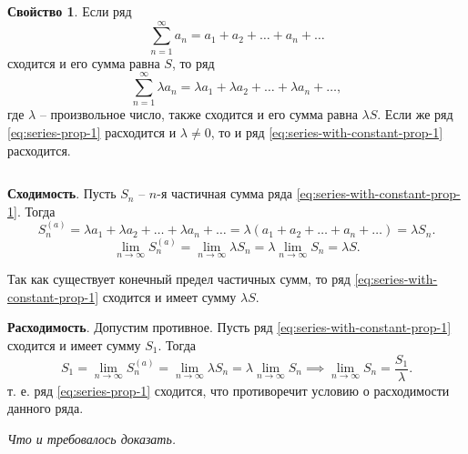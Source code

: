 \documentclass[a5paper, 11pt]{extbook}
\theoremstyle{definition}
\newtheorem{property}{Свойство}[section]
\theoremstyle{definition}
\theoremstyle{definition}
\newcommand{\newpar}{$ $\par\nobreak\ignorespaces}
\renewenvironment{proof}{{\noindent\bfseries Доказательство.}}{\smallskip\newpar \hfill\textit{Что и требовалось доказать.}}
\begin{document}
\begin{property}
    Если ряд
    \begin{equation}
        \label{eq:series-prop-1}
        \sum_{n = 1}^{\infty} a_n = a_1 + a_2 + \ldots + a_n + \ldots
    \end{equation}
    сходится и его сумма равна \(S\), то ряд
    \begin{equation}
        \label{eq:series-with-constant-prop-1}
        \sum_{n = 1}^{\infty} \lambda a_n = \lambda a_1 + \lambda a_2 + \ldots + \lambda a_n + \ldots,
    \end{equation}
    где \(\lambda\) -- произвольное число, также сходится и его сумма равна \(\lambda S\). Если же ряд \eqref{eq:series-prop-1} расходится и \(\lambda \neq 0\), то и ряд \eqref{eq:series-with-constant-prop-1} расходится.

    \begin{proof}
        \newpar
        \textbf{Сходимость}. Пусть \(S_n\) -- \(n\)-я частичная сумма ряда \eqref{eq:series-with-constant-prop-1}. Тогда
        \[
            S_n^{(a)} = \lambda a_1 + \lambda a_2 + \ldots + \lambda a_n + \ldots =
            \lambda (a_1 + a_2 + \ldots + a_n + \ldots) =
            \lambda S_n.
        \]
        \[
            \lim_{n \to \infty} S_n^{(a)} =
            \lim_{n \to \infty} \lambda S_n =
            \lambda \lim_{n \to \infty} S_n =
            \lambda S.
        \]

        Так как существует конечный предел частичных сумм, то ряд \eqref{eq:series-with-constant-prop-1} сходится и имеет сумму \(\lambda S\).

        \textbf{Расходимость}. Допустим противное. Пусть ряд \eqref{eq:series-with-constant-prop-1} сходится и имеет сумму \(S_1\). Тогда
        \[
            S_1 = \lim_{n \to \infty} S_n^{(a)} =
            \lim_{n \to \infty} \lambda S_n =
            \lambda \lim_{n \to \infty} S_n
            \implies
            \lim_{n \to \infty} S_n = \frac{S_1}{\lambda}.
        \]
        т. е. ряд \eqref{eq:series-prop-1} сходится, что противоречит условию о расходимости данного ряда.
    \end{proof}
\end{property}
\end{document}
